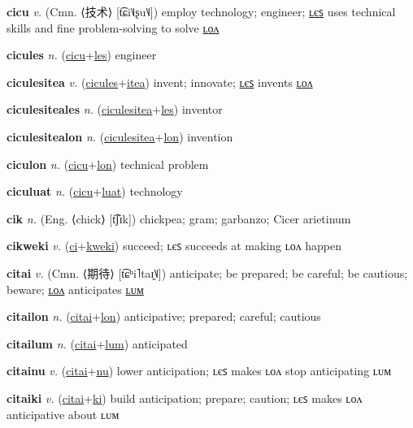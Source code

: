 \textbf{\hypertarget{cicu}{cicu}} \textit{v.} (Cmn. ⟨{\chinese{}技术}⟩ [t͡ɕi˥˩ʂu˥˩])
employ technology; engineer; \hyperlink{cicules}{ʟєꜱ} uses technical skills and fine problem-solving to solve \hyperlink{ciculon}{ʟᴏᴧ}

\textbf{\hypertarget{cicules}{cicules}} \textit{n.} (\hyperlink{cicu}{cicu}+\allowbreak \hyperlink{les}{les})
engineer

\textbf{\hypertarget{ciculesitea}{ciculesitea}} \textit{v.} (\hyperlink{cicules}{cicules}+\allowbreak \hyperlink{itea}{itea})
invent; innovate; \hyperlink{ciculesiteales}{ʟєꜱ} invents \hyperlink{ciculesitealon}{ʟᴏᴧ}

\textbf{\hypertarget{ciculesiteales}{ciculesiteales}} \textit{n.} (\hyperlink{ciculesitea}{ciculesitea}+\allowbreak \hyperlink{les}{les})
inventor

\textbf{\hypertarget{ciculesitealon}{ciculesitealon}} \textit{n.} (\hyperlink{ciculesitea}{ciculesitea}+\allowbreak \hyperlink{lon}{lon})
invention

\textbf{\hypertarget{ciculon}{ciculon}} \textit{n.} (\hyperlink{cicu}{cicu}+\allowbreak \hyperlink{lon}{lon})
technical problem

\textbf{\hypertarget{ciculuat}{ciculuat}} \textit{n.} (\hyperlink{cicu}{cicu}+\allowbreak \hyperlink{luat}{luat})
technology

\textbf{\hypertarget{cik}{cik}} \textit{n.} (Eng. ⟨chick⟩ [t͡ʃɪk])
chickpea; gram; garbanzo; Cicer arietinum

\textbf{\hypertarget{cikweki}{cikweki}} \textit{v.} (\hyperlink{ci}{ci}+\allowbreak \hyperlink{kweki}{kweki})
succeed; ʟєꜱ succeeds at making ʟᴏᴧ happen

\textbf{\hypertarget{citai}{citai}} \textit{v.} (Cmn. ⟨{\chinese{}期待}⟩ [t͡ɕʰi˥taɪ̯˥˩])
anticipate; be prepared; be careful; be cautious; beware; \hyperlink{citailon}{ʟᴏᴧ} anticipates \hyperlink{citailum}{ʟᴜᴍ}

\textbf{\hypertarget{citailon}{citailon}} \textit{n.} (\hyperlink{citai}{citai}+\allowbreak \hyperlink{lon}{lon})
anticipative; prepared; careful; cautious

\textbf{\hypertarget{citailum}{citailum}} \textit{n.} (\hyperlink{citai}{citai}+\allowbreak \hyperlink{lum}{lum})
anticipated

\textbf{\hypertarget{citainu}{citainu}} \textit{v.} (\hyperlink{citai}{citai}+\allowbreak \hyperlink{nu}{nu})
lower anticipation; ʟєꜱ makes ʟᴏᴧ stop anticipating ʟᴜᴍ

\textbf{\hypertarget{citaiki}{citaiki}} \textit{v.} (\hyperlink{citai}{citai}+\allowbreak \hyperlink{ki}{ki})
build anticipation; prepare; caution; ʟєꜱ makes ʟᴏᴧ anticipative about ʟᴜᴍ


